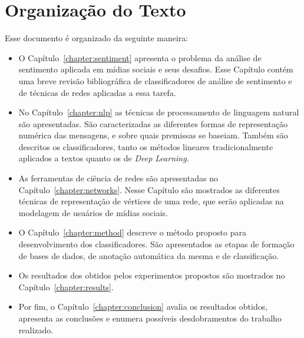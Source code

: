 \section{Organização do Texto}

Esse documento é organizado da seguinte maneira:

\begin{itemize}
    \item O Capítulo~\ref{chapter:sentiment} apresenta o problema da análise
        de sentimento aplicada em mídias sociais e seus desafios.
        Esse Capítulo contém uma breve revisão bibliográfica de classificadores
        de análise de sentimento e de técnicas de redes aplicadas a essa tarefa.
    \item No Capítulo~\ref{chapter:nlp} as técnicas de processamento de
        linguagem natural são apresentadas.
        São caracterizadas as diferentes formas de representação numérica das
        mensagens, e sobre quais premissas se baseiam.
        Também são descritos os classificadores, tanto os métodos lineares
        tradicionalmente aplicados a textos quanto os de \textit{Deep Learning}.
    \item As ferramentas de ciência de redes são apresentadas no
        Capítulo~\ref{chapter:networks}.
        Nesse Capítulo são mostrados as diferentes técnicas de representação de
        vértices de uma rede, que serão aplicadas na modelagem de usuários de
        mídias sociais.
    \item O Capítulo~\ref{chapter:method} descreve o método proposto para
        desenvolvimento dos classificadores.
        São apresentados as etapas de formação de bases de dados, de anotação
        automática da mesma e de classificação.
    \item Os resultados dos obtidos pelos experimentos propostos são mostrados
        no Capítulo~\ref{chapter:results}.
    \item Por fim, o Capítulo~\ref{chapter:conclusion} avalia os resultados
        obtidos, apresenta as conclusões e enumera possíveis desdobramentos do
        trabalho realizado.
\end{itemize}

